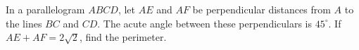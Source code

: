In a parallelogram $ABCD$, let $AE$ and $AF$ be perpendicular distances from $A$ to the lines $BC$ and $CD$. The acute angle between these perpendiculars is $45^\circ$. If $AE+AF=2\sqrt2$, find the perimeter.
